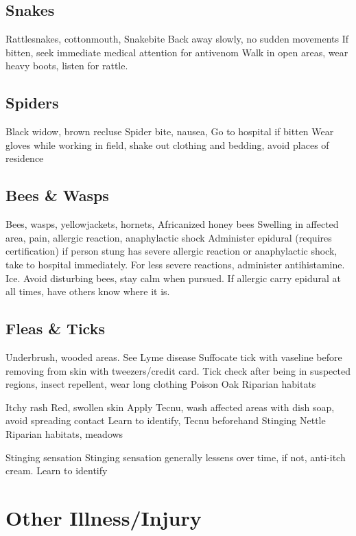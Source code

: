 \documentclass[12pt]{../SOP2}
\begin{document}
\subsection{Snakes}

Rattlesnakes, cottonmouth, 
Snakebite
Back away slowly, no sudden movements
If bitten, seek immediate medical attention for antivenom
Walk in open areas, wear heavy boots, listen for rattle.

\subsection{Spiders}

Black widow, brown recluse
Spider bite, nausea, 
Go to hospital if bitten
Wear gloves while working in field, shake out clothing and bedding, avoid places of residence

\subsection{Bees \& Wasps}

Bees, wasps, yellowjackets, hornets, Africanized honey bees
Swelling in affected area, pain, allergic reaction, anaphylactic shock
Administer epidural (requires certification) if person stung has severe allergic reaction or anaphylactic shock, take to hospital immediately. For less severe reactions, administer antihistamine. Ice.
Avoid disturbing bees, stay calm when pursued. If allergic carry epidural at all times, have others know where it is.

\subsection{Fleas \& Ticks}

Underbrush, wooded areas.
See Lyme disease
Suffocate tick with vaseline before removing from skin with tweezers/credit card.
Tick check after being in suspected regions, insect repellent, wear long clothing
Poison Oak
Riparian habitats

Itchy rash
Red, swollen skin
Apply Tecnu, wash affected areas with dish soap, avoid spreading contact
Learn to identify, Tecnu beforehand
Stinging Nettle
Riparian habitats, meadows

Stinging sensation
Stinging sensation generally lessens over time, if not, anti-itch cream.
Learn to identify


\section{Other Illness/Injury}
\end{document}
